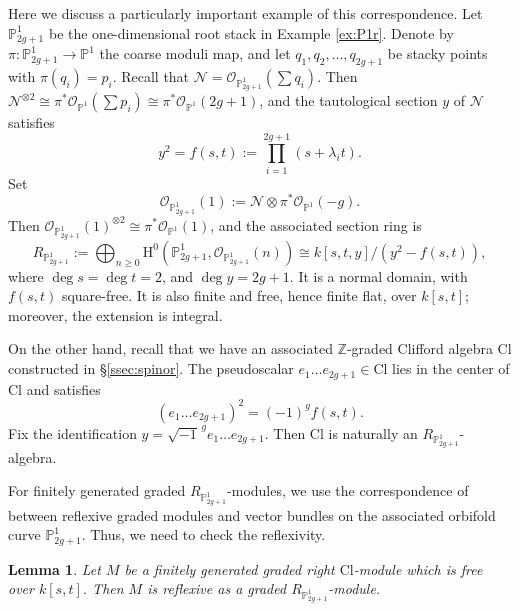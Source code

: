\documentclass[12pt, letterpaper]{amsart}
\newtheorem{lemma}[theorem]{Lemma}
\theoremstyle{definition}
\newcommand{\PP}{\mathbb{P} }
\newcommand{\ZZ}{\mathbb{Z} }
\newcommand{\cN}{\mathcal{N} }
\newcommand{\cO}{\mathcal{O} }
\newcommand{\rH}{\mathrm{H} }
\newcommand{\lbd}{\lambda}
\def\Cl{\mathrm{Cl}}
\begin{document}
Here we discuss a particularly important example of this correspondence. Let \(\PP_{2g+1}^1\) be the one-dimensional root stack in Example \ref{ex:P1r}. Denote by \(\pi:\PP_{2g+1}^1\to\PP^1\) the coarse moduli map, and let \(q_1, q_2, \dots, q_{2g+1}\) be stacky points with \(\pi(q_i) = p_i\). Recall that \(\cN = \cO_{\PP_{2g+1}^1}(\sum q_i)\). Then \(\cN^{\otimes2}\cong \pi^*\cO_{\PP^1}(\sum p_i) \cong \pi^*\cO_{\PP^1}(2g+1)\), and the tautological section \(y\) of \(\cN\) satisfies
\[y^2=f(s,t):=\prod_{i=1}^{2g+1}(s+\lbd_i t).\]
Set
\[\cO_{\PP_{2g+1}^1}(1):=\cN\otimes \pi^*\cO_{\PP^1}(-g).\]
Then \(\cO_{\PP_{2g+1}^1}(1)^{\otimes2}\cong \pi^*\cO_{\PP^1}(1)\), and the associated section ring is
\[R_{\PP_{2g+1}^1}:=\bigoplus_{n\ge0}\rH^0\!\left(\PP_{2g+1}^1,\cO_{\PP_{2g+1}^1}(n)\right)\cong k[s,t,y]/(y^2-f(s,t)),\]
where \(\deg s=\deg t=2\), and \(\deg y=2g+1\). It is a normal domain, with \(f(s,t)\) square-free. It is also finite and free, hence finite flat, over \(k[s,t]\); moreover, the extension is integral.

On the other hand, recall that we have an associated \(\ZZ\)-graded Clifford algebra \(\Cl\) constructed in \S\ref{ssec:spinor}. The pseudoscalar \(e_1\dots e_{2g+1} \in \Cl\) lies in the center of \(\Cl\) and satisfies
\[(e_1\dots e_{2g+1})^2 = (-1)^g f(s,t).\]
Fix the identification \(y=\sqrt{-1}^{\,g}e_1\dots e_{2g+1}\). Then \(\Cl\) is naturally an \(R_{\PP_{2g+1}^1}\)-algebra.

For finitely generated graded \(R_{\PP_{2g+1}^1}\)-modules, we use the correspondence of \cite[Lemma~3.2]{HO20} between reflexive graded modules and vector bundles on the associated orbifold curve \(\PP_{2g+1}^1\). Thus, we need to check the reflexivity.

\begin{lemma}\label{lem:reflexive_R_module}
Let \(M\) be a finitely generated graded right \(\Cl\)-module which is free over \(k[s,t]\). Then \(M\) is reflexive as a graded \(R_{\PP_{2g+1}^1}\)-module.
\end{lemma}
\end{document}
